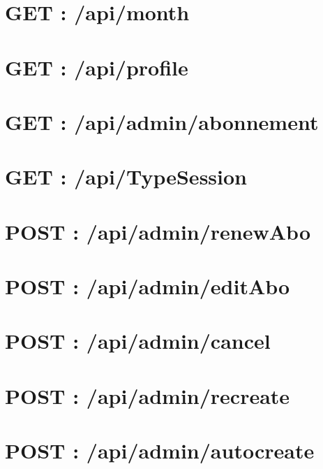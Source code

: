\vspace{\baselineskip}
\section{GET : /api/month}
	
	

\vspace{\baselineskip}
\section{GET : /api/profile}
	
	

\newpage
\section{GET : /api/admin/abonnement}
	
	
	
\newpage
\section{GET : /api/TypeSession}
	


\vspace{\baselineskip}
\section{POST : /api/admin/renewAbo}
	
	
	
\vspace{\baselineskip}
\section{POST : /api/admin/editAbo}
	
	

\vspace{\baselineskip}
\section{POST : /api/admin/cancel}
	
	
	
\vspace{\baselineskip}
\section{POST : /api/admin/recreate}
	
	
	
\newpage
\section{POST : /api/admin/autocreate}
	
	
